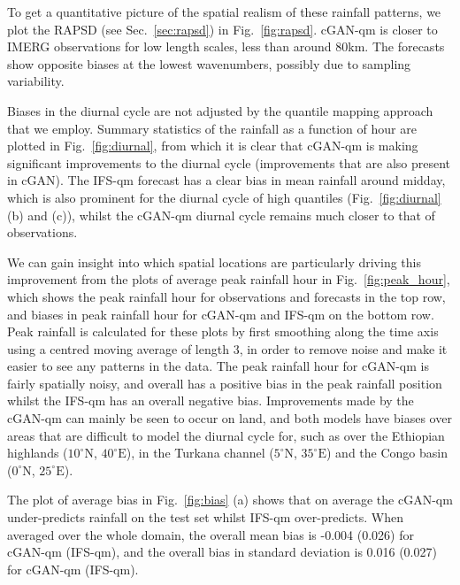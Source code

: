 \documentclass{article}
\begin{document}
To get a quantitative picture of the spatial realism of these rainfall patterns, we plot the RAPSD (see Sec.~\ref{sec:rapsd}) in Fig.~\ref{fig:rapsd}. cGAN-qm is closer to IMERG observations for low length scales, less than around 80km. The forecasts show opposite biases at the lowest wavenumbers, possibly due to sampling variability.

Biases in the diurnal cycle are not adjusted by the quantile mapping approach that we employ. Summary statistics of the rainfall as a function of hour are plotted in Fig.~\ref{fig:diurnal}, from which it is clear that cGAN-qm is making significant improvements to the diurnal cycle (improvements that are also present in cGAN). The IFS-qm forecast has a clear bias in mean rainfall around midday, which is also prominent for the diurnal cycle of high quantiles (Fig.~\ref{fig:diurnal} (b) and (c)), whilst the cGAN-qm diurnal cycle remains much closer to that of observations. 

We can gain insight into which spatial locations are particularly driving this improvement from the plots of average peak rainfall hour in Fig.~\ref{fig:peak_hour}, which shows the peak rainfall hour for observations and forecasts in the top row, and biases in peak rainfall hour for cGAN-qm and IFS-qm on the bottom row. Peak rainfall is calculated for these plots by first smoothing along the time axis using a centred moving average of length 3, in order to remove noise and make it easier to see any patterns in the data. The peak rainfall hour for cGAN-qm is fairly spatially noisy, and overall has a positive bias in the peak rainfall position whilst the IFS-qm has an overall negative bias. Improvements made by the cGAN-qm can mainly be seen to occur on land, and both models have biases over areas that are difficult to model the diurnal cycle for, such as over the Ethiopian highlands ($10^{\circ}\text{N}
$, $40^{\circ}\text{E}$), in the Turkana channel ($5^{\circ}\text{N}
$, $35^{\circ}\text{E}$) and the Congo basin ($0^{\circ}\text{N}
$, $25^{\circ}\text{E}$).


The plot of average bias in Fig.~\ref{fig:bias} (a) shows that on average the cGAN-qm under-predicts rainfall on the test set whilst IFS-qm over-predicts. When averaged over the whole domain, the overall mean bias is -0.004 (0.026) for cGAN-qm (IFS-qm), and the overall bias in standard deviation is 0.016 (0.027) for cGAN-qm (IFS-qm).


\end{document}
